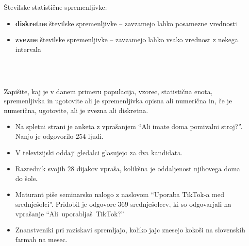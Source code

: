             

                Številske statistične spremenljivke:
                \begin{itemize}
                    \item \textbf{diskretne} številske spremenljivke -- zavzamejo lahko posamezne vrednosti
                    \item \textbf{zvezne} številske spremenljivke -- zavzamejo lahko vsako vrednost z nekega intervala
                \end{itemize}

            


                ~\\~\\



        
            \begin{naloga}
                Zapišite, kaj je v danem primeru populacija, vzorec, statistična enota, spremenljivka in 
                ugotovite ali je spremenljivka opisna ali numerična in, če je numerična, ugotovite, ali je zvezna ali diskretna.
                \begin{itemize}
                        \item Na spletni strani je anketa z vprašanjem ``Ali imate doma pomivalni stroj?''. Nanjo je odgovorilo $254$ ljudi. 
                        \item V televizijski oddaji gledalci glasujejo za dva kandidata. 
                        \item Razrednik svojih $28$ dijakov vpraša, kolikšna je oddaljenost njihovega doma do šole.
                        \item Maturant piše seminarsko nalogo z naslovom ``Uporaba TikTok-a med srednješolci''. Pridobil je odgovore $369$ srednješolcev, ki so odgovarjali na vprašanje ``Ali~uporabljaš~TikTok?'' 
                        \item Znanstveniki pri raziskavi spremljajo, koliko jajc znesejo kokoši na slovenskih farmah na mesec.
                \end{itemize}
            \end{naloga}
        

        



